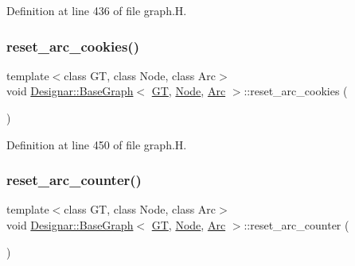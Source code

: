 Definition at line 436 of file graph.\+H.

\mbox{\label{class_designar_1_1_base_graph_a44b6cefb8966ed69a0d80bfe7e4546cb}} 
\subsubsection{\texorpdfstring{reset\+\_\+arc\+\_\+cookies()}{reset\_arc\_cookies()}}
{\footnotesize\ttfamily template$<$class GT, class Node, class Arc$>$ \\
void \hyperlink{class_designar_1_1_base_graph}{Designar\+::\+Base\+Graph}$<$ \hyperlink{demo-buildgraph_8_c_a3001c40d2c31ca87ed96cd7d1334a55e}{GT}, \hyperlink{namespace_designar_a5af326c65aa2bd26b26c410f2030d09e}{Node}, \hyperlink{namespace_designar_a3f55fb5513d62ff47cbc8f72b8e95d6f}{Arc} $>$\+::reset\+\_\+arc\+\_\+cookies (\begin{DoxyParamCaption}{ }\end{DoxyParamCaption})\hspace{0.3cm}{\ttfamily [inline]}}



Definition at line 450 of file graph.\+H.

\mbox{\label{class_designar_1_1_base_graph_a8b22e29aa37006fab9c219de86660bdd}} 
\subsubsection{\texorpdfstring{reset\+\_\+arc\+\_\+counter()}{reset\_arc\_counter()}}
{\footnotesize\ttfamily template$<$class GT, class Node, class Arc$>$ \\
void \hyperlink{class_designar_1_1_base_graph}{Designar\+::\+Base\+Graph}$<$ \hyperlink{demo-buildgraph_8_c_a3001c40d2c31ca87ed96cd7d1334a55e}{GT}, \hyperlink{namespace_designar_a5af326c65aa2bd26b26c410f2030d09e}{Node}, \hyperlink{namespace_designar_a3f55fb5513d62ff47cbc8f72b8e95d6f}{Arc} $>$\+::reset\+\_\+arc\+\_\+counter (\begin{DoxyParamCaption}{ }\end{DoxyParamCaption})\hspace{0.3cm}{\ttfamily [inline]}}




